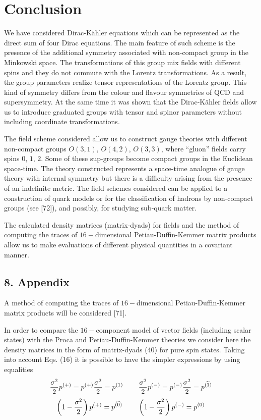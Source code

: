 \documentclass[a4paper,12pt]{article}
\begin{document}
\section{Conclusion}

We have considered Dirac-K\"ahler equations which can be represented as the
direct sum of four Dirac equations. The main feature of such scheme is the
presence of the additional symmetry associated with non-compact group in the
Minkowski space. The transformations of this group mix fields with different
spins and they do not commute with the Lorentz transformations. As a result,
the group parameters realize tensor representations of the Lorentz group.
This kind of symmetry differs from the colour and flavour symmetries of QCD
and supersymmetry. At the same time it was shown that the Dirac-K\"ahler
fields allow us to introduce graduated groups with tensor and spinor
parameters without including coordinate transformations.

The field scheme considered allow us to construct gauge theories with
different non-compact groups $O(3,1)$, $O(4,2)$, $O(3,3)$, where ``gluon''
fields carry spins $0$, $1$, $2$. Some of these sup-groups become compact
groups in the Euclidean space-time. The theory constructed represents a
space-time analogue of gauge theory with internal symmetry but there is a
difficulty arising from the presence of an indefinite metric. The field
schemes considered can be applied to a construction of quark models or for
the classification of hadrons by non-compact groups (see [72]), and
possibly, for studying sub-quark matter.

The calculated density matrices (matrix-dyads) for fields and the method of
computing the traces of $16-$dimensional Petiau-Duffin-Kemmer matrix
products allow us to make evaluations of different physical quantities in a
covariant manner.

\subsection{8. Appendix}

A method of computing the traces of $16-$dimensional Petiau-Duffin-Kemmer
matrix products will be considered [71].

In order to compare the $16-$component model of vector fields (including
scalar states) with the Proca and Petiau-Duffin-Kemmer theories we consider
here the density matrices in the form of matrix-dyads (40) for pure spin
states. Taking into account Eqs. (16) it is possible to have the simpler
expressions by using equalities
\[
\frac{\sigma ^2}2p^{(+)}=p^{(+)}\frac{\sigma
^2}2=p^{(1)}\hspace{0.3in}\frac{ \sigma
^2}2p^{(-)}=p^{(-)}\frac{\sigma ^2}2=p^{(\widetilde{1})}
\]
\begin{equation}
\left( 1-\frac{\sigma ^2}2\right)
p^{(+)}=p^{(\widetilde{0})}\hspace{0.3in} \left( 1-\frac{\sigma
^2}2\right) p^{(-)}=p^{(0)}  \label{114}
\end{equation}
\end{document}
